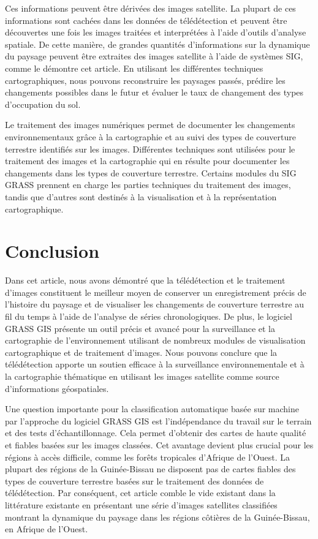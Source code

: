 \documentclass{rfpt}
\begin{document}
Ces informations peuvent être dérivées des images satellite. La plupart de ces informations sont cachées dans les données de télédétection et peuvent être découvertes une fois les images traitées et interprétées à l’aide d’outils d’analyse spatiale. De cette manière, de grandes quantités d’informations sur la dynamique du paysage peuvent être extraites des images satellite à l’aide de systèmes SIG, comme le démontre cet article. En utilisant les différentes techniques cartographiques, nous pouvons reconstruire les paysages passés, prédire les changements possibles dans le futur et évaluer le taux de changement des types d'occupation du sol.

Le traitement des images numériques permet de documenter les changements environnementaux grâce à la cartographie et au suivi des types de couverture terrestre identifiés sur les images. Différentes techniques sont utilisées pour le traitement des images et la cartographie qui en résulte pour documenter les changements dans les types de couverture terrestre. Certains modules du SIG GRASS prennent en charge les parties techniques du traitement des images, tandis que d'autres sont destinés à la visualisation et à la représentation cartographique.

\section{Conclusion}

Dans cet article, nous avons démontré que la télédétection et le traitement d’images constituent le meilleur moyen de conserver un enregistrement précis de l’histoire du paysage et de visualiser les changements de couverture terrestre au fil du temps à l’aide de l’analyse de séries chronologiques. De plus, le logiciel GRASS GIS présente un outil précis et avancé pour la surveillance et la cartographie de l'environnement utilisant de nombreux modules de visualisation cartographique et de traitement d'images. Nous pouvons conclure que la télédétection apporte un soutien efficace à la surveillance environnementale et à la cartographie thématique en utilisant les images satellite comme source d’informations géospatiales.

Une question importante pour la classification automatique basée sur machine par l’approche du logiciel GRASS GIS est l’indépendance du travail sur le terrain et des tests d’échantillonnage. Cela permet d’obtenir des cartes de haute qualité et fiables basées sur les images classées. Cet avantage devient plus crucial pour les régions à accès difficile, comme les forêts tropicales d’Afrique de l’Ouest. La plupart des régions de la Guinée-Bissau ne disposent pas de cartes fiables des types de couverture terrestre basées sur le traitement des données de télédétection. Par conséquent, cet article comble le vide existant dans la littérature existante en présentant une série d’images satellites classifiées montrant la dynamique du paysage dans les régions côtières de la Guinée-Bissau, en Afrique de l’Ouest.
\end{document}
